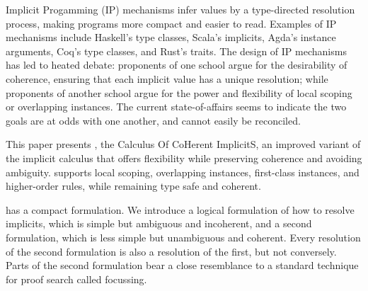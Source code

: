Implicit Progamming (IP) mechanisms infer values by a type-directed
resolution process, making programs more compact and easier to read.
Examples of IP mechanisms include Haskell's type classes, Scala's
implicits, Agda's instance arguments, Coq's type classes, and Rust's
traits.  The design of IP mechanisms has led to heated debate:
proponents of one school argue for the desirability of coherence, ensuring
that each implicit value has a unique resolution; while proponents of another
school argue for the power and flexibility of local scoping or
overlapping instances.  The current state-of-affairs seems to indicate
the two goals are at odds with one another, and cannot easily be
reconciled.

This paper presents \name, the Calculus Of CoHerent ImplicitS,
an improved variant of the implicit calculus that offers flexibility
while preserving coherence and avoiding ambiguity. \name supports local scoping,
overlapping instances, first-class instances, and higher-order
rules, while remaining type safe and coherent.

\name has a compact formulation.
We introduce a logical formulation of how to resolve implicits, which
is simple but ambiguous and incoherent, and a second formulation,
which is less simple but unambiguous and coherent.  Every resolution
of the second formulation is also a resolution of the first, but not
conversely.  Parts of the second formulation bear a close resemblance
to a standard technique for proof search called focussing.






